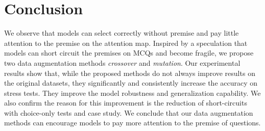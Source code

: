 \section{Conclusion}

We observe that models can select correctly without premise and 
pay little attention to the premise on the attention map. 
Inspired by a speculation that 
models can short circuit the premises on MCQs and become fragile, 
we propose two data augmentation methods 
\textit{crossover} and \textit{mutation}. 
Our experimental results show that, while the
proposed methods do not always improve
results on the original datasets,
they significantly and consistently increase the
accuracy on stress tests. 
They improve the model robustness and generalization capability. 
We also confirm the reason for this improvement is the reduction 
of short-circuits with choice-only tests and case study.
We conclude that our data augmentation methods can 
encourage models to pay more 
attention to the premise of questions. 

